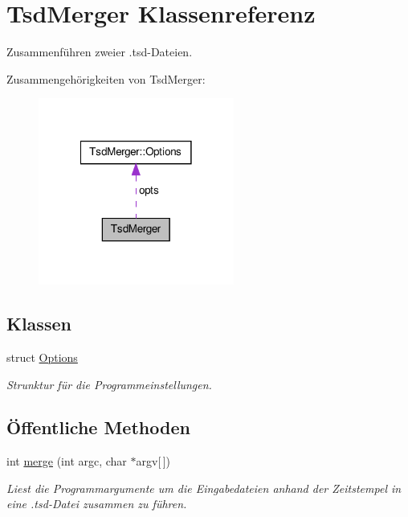 \hypertarget{classTsdMerger}{\section{Tsd\-Merger Klassenreferenz}
\label{classTsdMerger}
}


Zusammenführen zweier .tsd-\/\-Dateien.  




Zusammengehörigkeiten von Tsd\-Merger\-:\nopagebreak
\begin{figure}[H]
\begin{center}
\leavevmode
\includegraphics[width=182pt]{classTsdMerger__coll__graph}
\end{center}
\end{figure}
\subsection*{Klassen}
\begin{DoxyCompactItemize}
\item 
struct \hyperlink{structTsdMerger_1_1Options}{Options}
\begin{DoxyCompactList}\small\item\em Strunktur für die Programmeinstellungen. \end{DoxyCompactList}\end{DoxyCompactItemize}
\subsection*{Öffentliche Methoden}
\begin{DoxyCompactItemize}
\item 
int \hyperlink{classTsdMerger_aef6012e4a2b9c31440ba1f81114cda4c}{merge} (int argc, char $\ast$argv\mbox{[}$\,$\mbox{]})
\begin{DoxyCompactList}\small\item\em Liest die Programmargumente um die Eingabedateien anhand der Zeitstempel in eine .tsd-\/\-Datei zusammen zu führen. \end{DoxyCompactList}\end{DoxyCompactItemize}
